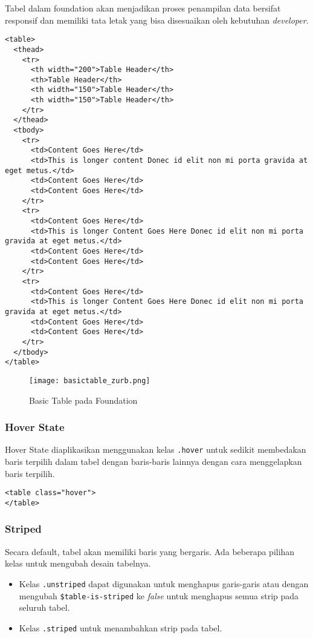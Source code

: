 {Tabel dalam foundation akan menjadikan proses penampilan data bersifat responsif dan memiliki tata letak yang bisa disesuaikan oleh kebutuhan \textit{developer}.


\begin{lstlisting}[frame=single, basicstyle=\tiny] 
<table>
  <thead>
    <tr>
      <th width="200">Table Header</th>
      <th>Table Header</th>
      <th width="150">Table Header</th>
      <th width="150">Table Header</th>
    </tr>
  </thead>
  <tbody>
    <tr>
      <td>Content Goes Here</td>
      <td>This is longer content Donec id elit non mi porta gravida at eget metus.</td>
      <td>Content Goes Here</td>
      <td>Content Goes Here</td>
    </tr>
    <tr>
      <td>Content Goes Here</td>
      <td>This is longer Content Goes Here Donec id elit non mi porta gravida at eget metus.</td>
      <td>Content Goes Here</td>
      <td>Content Goes Here</td>
    </tr>
    <tr>
      <td>Content Goes Here</td>
      <td>This is longer Content Goes Here Donec id elit non mi porta gravida at eget metus.</td>
      <td>Content Goes Here</td>
      <td>Content Goes Here</td>
    </tr>
  </tbody>
</table>
\end{lstlisting}

\begin{figure} [H]
	\centering  
	\texttt{[image: basictable\_zurb.png]}  
	\caption{Basic Table pada Foundation}
\end{figure}

\subsubsection{Hover State}
Hover State diaplikasikan menggunakan kelas \texttt{.hover} untuk sedikit membedakan baris terpilih dalam tabel dengan baris-baris lainnya dengan cara menggelapkan baris terpilih.
\begin{lstlisting}[frame=single] 
<table class="hover">
</table>
\end{lstlisting}

\subsubsection{Striped}
Secara default, tabel akan memiliki baris yang bergaris. 
Ada beberapa pilihan kelas untuk mengubah desain tabelnya.
\begin{itemize}
	\item Kelas \texttt{.unstriped} dapat digunakan untuk menghapus garis-garis atau dengan mengubah \verb|$table-is-striped| ke \textit{false} untuk menghapus semua strip pada seluruh tabel.
	\item Kelas \texttt{.striped} untuk menambahkan strip pada tabel.	
\end{itemize}

}
